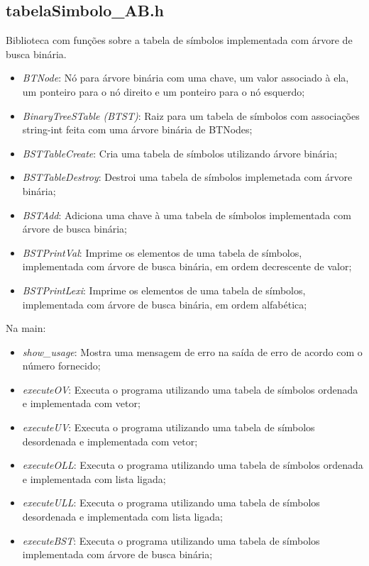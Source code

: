 \documentclass[12pt, a4paper]{article} %
\begin{document}
	\subsection{tabelaSimbolo\_AB.h}
	Biblioteca com funções sobre a tabela de símbolos implementada com árvore de busca binária.
	\begin{itemize}
		\item \textit{BTNode}: Nó para árvore binária com uma chave, um valor associado à ela, um ponteiro para o nó direito e um ponteiro para o nó esquerdo;
		\item \textit{BinaryTreeSTable (BTST)}: Raiz para um tabela de símbolos com associações string-int feita com uma árvore binária de BTNodes;
		\item \textit{BSTTableCreate}:  Cria uma tabela de símbolos utilizando árvore binária;
		\item \textit{BSTTableDestroy}: Destroi uma tabela de símbolos implemetada com árvore binária;
		\item \textit{BSTAdd}: Adiciona uma chave à uma tabela de símbolos implementada com árvore de busca binária;
		\item \textit{BSTPrintVal}: Imprime os elementos de uma tabela de símbolos, implementada com árvore de busca binária, em ordem decrescente de valor;
		\item \textit{BSTPrintLexi}: Imprime os elementos de uma tabela de símbolos, implementada com árvore de busca binária, em ordem alfabética; 
	\end{itemize}
	Na main: %
	\begin{itemize}
		\item \textit{show\_usage}: Mostra uma mensagem de erro na saída de erro de acordo com o número fornecido;
		\item \textit{executeOV}: Executa o programa utilizando uma tabela de símbolos ordenada e implementada com vetor;
		\item \textit{executeUV}: Executa o programa utilizando uma tabela de símbolos desordenada e implementada com vetor;
		\item \textit{executeOLL}: Executa o programa utilizando uma tabela de símbolos ordenada e implementada com lista ligada;
		\item \textit{executeULL}: Executa o programa utilizando uma tabela de símbolos desordenada e implementada com lista ligada;
		\item \textit{executeBST}: Executa o programa utilizando uma tabela de símbolos implementada com árvore de busca binária;
	\end{itemize}
\end{document}
